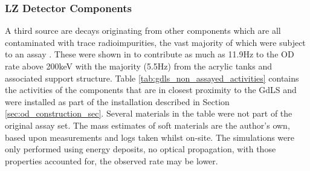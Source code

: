 \subsubsection{LZ Detector Components}
\par
A third source are decays originating from other components which are all contaminated with trace radioimpurities, the vast majority of which were subject to an assay \cite{LZ_assay_ref}.
These were shown in \cite{scotthaselschwardt_thesis_ref} to contribute as much as 11.9Hz to the OD rate above 200keV with the majority (5.5Hz) from the acrylic tanks and associated support structure.
Table \ref{tab:gdls_non_assayed_activities} contains the activities of the components that are in closest proximity to the GdLS and were installed as part of the installation described in Section \ref{sec:od_construction_sec}.
Several materials in the table were not part of the original assay set.
The mass estimates of soft materials are the author's own, based upon measurements and logs taken whilst on-site.
The simulations were only performed using energy deposits, no optical propagation, with those properties accounted for, the observed rate may be lower.

